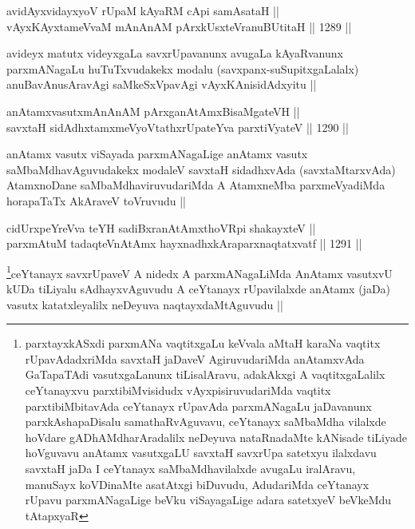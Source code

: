 \begin{shl}
avidAyxvidayxyoV rUpaM kAyaRM cApi samAsataH || \\
vAyxKAyxtameVvaM mAnAnAM pArxkUsxteVranuBUtitaH ||  1289 ||  
\end{shl}

\begin{artha}
avideyx matutx videyxgaLa savxrUpavanunx avugaLa kAyaRvanunx parxmANagaLu huTuTxvudakekx modalu (savxpanx-suSupitxgaLalalx) anuBavAnusAravAgi saMkeSxVpavAgi vAyxKAnisidAdxyitu ||
\end{artha}

\begin{shl}
anAtamxvasutxmAnAnAM pArxganAtAmxBisaMgateVH ||  \\
savxtaH sidAdhxtamxmeVyoVtathxrUpateYva parxtiVyateV ||  1290 ||  
\end{shl}

\begin{artha}
anAtamx vasutx viSayada parxmANagaLige anAtamx vasutx saMbaMdhavAguvudakekx modaleV savxtaH sidadhxvAda (savxtaMtarxvAda) AtamxnoDane saMbaMdhaviruvudariMda A AtamxneMba parxmeVyadiMda horapaTaTx AkAraveV toVruvudu ||
\end{artha}


\begin{shl}
cidUrxpeYreVva teYH sadiBxranAtAmxthoVR\s pi shakayxteV || \\
parxmAtuM tadaqteV\s nAtAmx hayxnadhxkAraparxnaqtatxvatf ||  1291 ||  
\end{shl}

\begin{artha}
\footnote{parxtayxkASxdi parxmANa vaqtitxgaLu keVvala aMtaH karaNa vaqtitx rUpavAdadxriMda savxtaH jaDaveV AgiruvudariMda anAtamxvAda GaTapaTAdi vasutxgaLanunx tiLisalAravu, adakAkxgi A vaqtitxgaLalilx ceYtanayxvu parxtibiMvisidudx vAyxpisiruvudariMda vaqtitx parxtibiMbitavAda ceYtanayx rUpavAda parxmANagaLu jaDavanunx parxkAshapaDisalu samathaRvAguvavu, ceYtanayx saMbaMdha vilalxde hoVdare gADhAMdharAradalilx neDeyuva nataRnadaMte kANisade tiLiyade hoVguvavu anAtamx vasutxgaLU savxtaH savxrUpa satetxyu ilalxdavu savxtaH jaDa I ceYtanayx saMbaMdhavilalxde avugaLu iralAravu, manuSayx koVDinaMte asatAtxgi biDuvudu, AdudariMda ceYtanayx rUpavu parxmANagaLige beVku viSayagaLige adara satetxyeV beVkeMdu tAtapxyaR}ceYtanayx savxrUpaveV A nidedx A parxmANagaLiMda AnAtamx vasutxvU kUDa tiLiyalu sAdhayxvAguvudu A ceYtanayx rUpavilalxde anAtamx (jaDa) vasutx katatxleyalilx neDeyuva naqtayxdaMtAguvudu ||
\end{artha}

